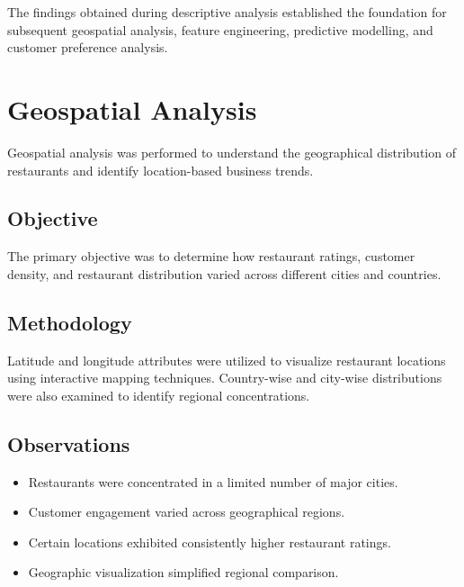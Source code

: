 \documentclass[12pt,a4paper]{report}
\begin{document}
The findings obtained during descriptive analysis established the foundation for subsequent geospatial analysis, feature engineering, predictive modelling, and customer preference analysis.



\section{Geospatial Analysis}

Geospatial analysis was performed to understand the geographical distribution of restaurants and identify location-based business trends.

\subsection{Objective}

The primary objective was to determine how restaurant ratings, customer density, and restaurant distribution varied across different cities and countries.

\subsection{Methodology}

Latitude and longitude attributes were utilized to visualize restaurant locations using interactive mapping techniques. Country-wise and city-wise distributions were also examined to identify regional concentrations.

\subsection{Observations}

\begin{itemize}
\item Restaurants were concentrated in a limited number of major cities.
\item Customer engagement varied across geographical regions.
\item Certain locations exhibited consistently higher restaurant ratings.
\item Geographic visualization simplified regional comparison.
\end{itemize}
\end{document}
